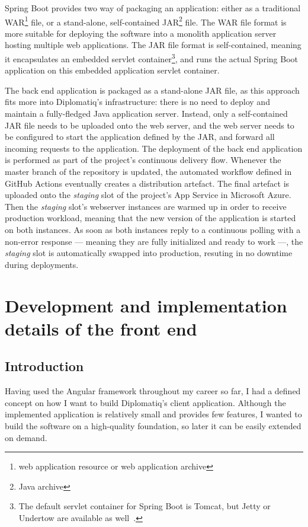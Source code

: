 Spring Boot provides two way of packaging an application: either as a traditional WAR\footnote{web application resource or web application archive} file, or a stand-alone, self-contained JAR\footnote{Java archive} file. The WAR file format is more suitable for deploying the software into a monolith application server hosting multiple web applications. The JAR file format is self-contained, meaning it encapsulates an embedded servlet container\footnote{The default servlet container for Spring Boot is Tomcat, but Jetty or Undertow are available as well~\cite{spring-boot-reference-docs}.}, and runs the actual Spring Boot application on this embedded application servlet container.

The back end application is packaged as a stand-alone JAR file, as this approach fits more into Diplomatiq's infrastructure: there is no need to deploy and maintain a fully-fledged Java application server. Instead, only a self-contained JAR file needs to be uploaded onto the web server, and the web server needs to be configured to start the application defined by the JAR, and forward all incoming requests to the application. The deployment of the back end application is performed as part of the project's continuous delivery flow. Whenever the master branch of the repository is updated, the automated workflow defined in GitHub Actions eventually creates a distribution artefact. The final artefact is uploaded onto the \emph{staging} slot of the project's App Service in Microsoft Azure. Then the \emph{staging} slot's webserver instances are warmed up in order to receive production workload, meaning that the new version of the application is started on both instances. As soon as both instances reply to a continuous polling with a non-error response — meaning they are fully initialized and ready to work —, the \emph{staging} slot is automatically swapped into production, resuting in no downtime during deployments.

\section{Development and implementation details of the front end}

\subsection{Introduction}

Having used the Angular framework throughout my career so far, I had a defined concept on how I want to build Diplomatiq's client application. Although the implemented application is relatively small and provides few features, I wanted to build the software on a high-quality foundation, so later it can be easily extended on demand.

